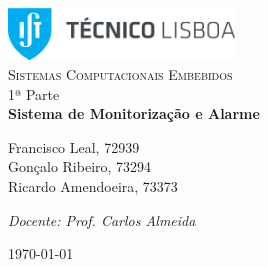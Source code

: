 \begin{titlepage}

	\begin{center}

		\includegraphics[width=6cm]{img/tecnico_logo}\\[3cm]

		\textsc{\LARGE Sistemas Computacionais Embebidos}\\[1.5cm]

		\Large 1ª Parte\\[1.5cm]


		{ \huge \bfseries Sistema de Monitorização e Alarme\\[2.5cm] }


		\noindent
		\begin{center} \large
			Francisco Leal, 72939\\[5mm]		
		
			Gonçalo Ribeiro, 73294\\[5mm]

			Ricardo Amendoeira, 73373\\[2.5mm]
			
			\vfill

			\textit{Docente: Prof. Carlos Almeida}\\[1cm]

		\end{center}

		{\large \today}

	\end{center}

\end{titlepage}